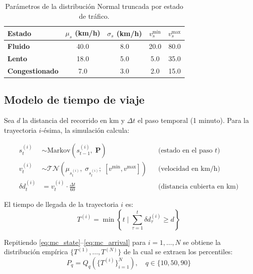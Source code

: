 \documentclass[12pt, a4paper]{article}
\theoremstyle{definition}
\begin{document}
\begin{table}[h!]
\centering
\renewcommand{\arraystretch}{1.3}
\begin{tabular}{lcccc}
\toprule
\textbf{Estado} & $\mu_s$ (km/h) & $\sigma_s$ (km/h) & $v^\text{min}_s$ & $v^\text{max}_s$ \\
\midrule
\textcolor{fluido}{\textbf{Fluido}}               & 40.0 & 8.0 & 20.0 & 80.0 \\
\textcolor{lento}{\textbf{Lento}}                 & 18.0 & 5.0 &  5.0 & 35.0 \\
\textcolor{congestionado}{\textbf{Congestionado}} &  7.0 & 3.0 &  2.0 & 15.0 \\
\bottomrule
\end{tabular}
\caption{Parámetros de la distribución Normal truncada por estado de tráfico.}
\end{table}

\subsection{Modelo de tiempo de viaje}

Sea $d$ la distancia del recorrido en km y $\Delta t$ el paso temporal
(1 minuto). Para la trayectoria $i$-ésima, la simulación calcula:

\begin{align}
    s^{(i)}_t &\sim \text{Markov}\!\left(s^{(i)}_{t-1},\; \mathbf{P}\right)
        && \text{(estado en el paso } t \text{)} \label{eq:mc_state} \\
    v^{(i)}_t &\sim \mathcal{TN}\!\left(\mu_{s^{(i)}_t},\; \sigma_{s^{(i)}_t};\;
        [v^\text{min}, v^\text{max}]\right)
        && \text{(velocidad en km/h)} \label{eq:mc_velocity} \\
    \delta d^{(i)}_t &= v^{(i)}_t \cdot \frac{\Delta t}{60}
        && \text{(distancia cubierta en km)} \label{eq:mc_dist_step}
\end{align}

El tiempo de llegada de la trayectoria $i$ es:
\begin{equation}
    T^{(i)} = \min\!\left\{t \;\Big|\; \sum_{\tau=1}^{t} \delta d^{(i)}_\tau \geq d\right\}
    \label{eq:mc_arrival}
\end{equation}

Repitiendo \eqref{eq:mc_state}–\eqref{eq:mc_arrival} para $i = 1, \ldots, N$
se obtiene la distribución empírica $\{T^{(1)}, \ldots, T^{(N)}\}$
de la cual se extraen los percentiles:
\begin{equation}
    P_{q} = Q_q\!\left(\{T^{(i)}\}_{i=1}^{N}\right), \quad q \in \{10, 50, 90\}
    \label{eq:percentiles}
\end{equation}
\end{document}
